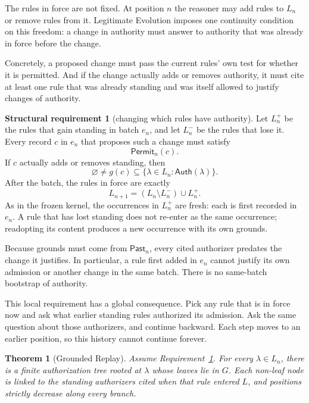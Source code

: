 \documentclass[11pt]{article}
\newtheorem{theorem}{Theorem}
\theoremstyle{definition}
\newtheorem{requirement}{Structural requirement}
\theoremstyle{remark}
\newcommand{\Past}{\mathsf{Past}}
\newcommand{\Auth}{\mathsf{Auth}}
\newcommand{\Permit}{\mathsf{Permit}}
\begin{document}
The rules in force are not fixed. At position $n$ the reasoner may add rules to
$L_n$ or remove rules from it. Legitimate Evolution imposes one continuity
condition on this freedom: a change in authority must answer to authority that
was already in force before the change.

Concretely, a proposed change must pass the current rules' own test for whether
it is permitted. And if the change actually adds or removes authority, it must
cite at least one rule that was already standing and was itself allowed to
justify changes of authority.

\begin{requirement}[changing which rules have authority]\label{req:standing-change}
Let $L_n^+$ be the rules that gain standing in batch $e_n$, and let $L_n^-$ be
the rules that lose it. Every record $c$ in $e_n$ that proposes such a change
must satisfy
\[
 \Permit_n(c).
\]
If $c$ actually adds or removes standing, then
\[
 \varnothing\neq g(c)\subseteq\{\lambda\in L_n:\Auth(\lambda)\}.
\]
After the batch, the rules in force are exactly
\[
 L_{n+1}=(L_n\setminus L_n^-)\cup L_n^+.
\]
As in the frozen kernel, the occurrences in $L_n^+$ are fresh: each is first
recorded in $e_n$. A rule that has lost standing does not re-enter as the same
occurrence; readopting its content produces a new occurrence with its own
grounds.
\end{requirement}

Because grounds must come from $\Past_n$, every cited authorizer predates the
change it justifies. In particular, a rule first added in $e_n$ cannot justify
its own admission or another change in the same batch. There is no same-batch
bootstrap of authority.

This local requirement has a global consequence. Pick any rule that is in force
now and ask what earlier standing rules authorized its admission. Ask the same
question about those authorizers, and continue backward. Each step moves to an
earlier position, so this history cannot continue forever.

\begin{theorem}[Grounded Replay]\label{thm:replay}
Assume Requirement~\ref{req:standing-change}. For every $\lambda\in L_n$,
there is a finite authorization tree rooted at $\lambda$ whose leaves lie in
$G$. Each non-leaf node is linked to the standing authorizers cited when that
rule entered $L$, and positions strictly decrease along every branch.
\end{theorem}
\end{document}
